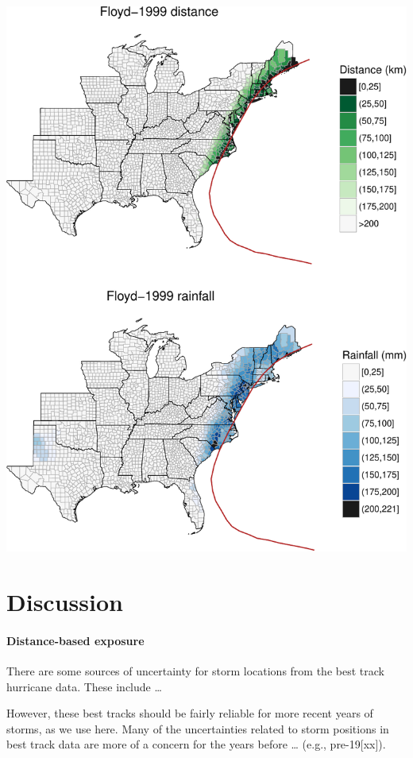 \documentclass[]{elsarticle} %
\makeatletter
\def\maxwidth{\ifdim\Gin@nat@width>\linewidth\linewidth
\else\Gin@nat@width\fi}
\let\Oldincludegraphics\includegraphics
\renewcommand{\includegraphics}[1]{\Oldincludegraphics[width=\maxwidth]{#1}}
\makeatother
\begin{document}
\includegraphics{DraftExposurePaper_files/figure-latex/unnamed-chunk-3-1.pdf}

\section{Discussion}\label{discussion}

\paragraph{Distance-based exposure}\label{distance-based-exposure-1}

There are some sources of uncertainty for storm locations from the best
track hurricane data. These include \ldots{}

However, these best tracks should be fairly reliable for more recent
years of storms, as we use here. Many of the uncertainties related to
storm positions in best track data are more of a concern for the years
before \ldots{} (e.g., pre-19{[}xx{]}).
\end{document}
